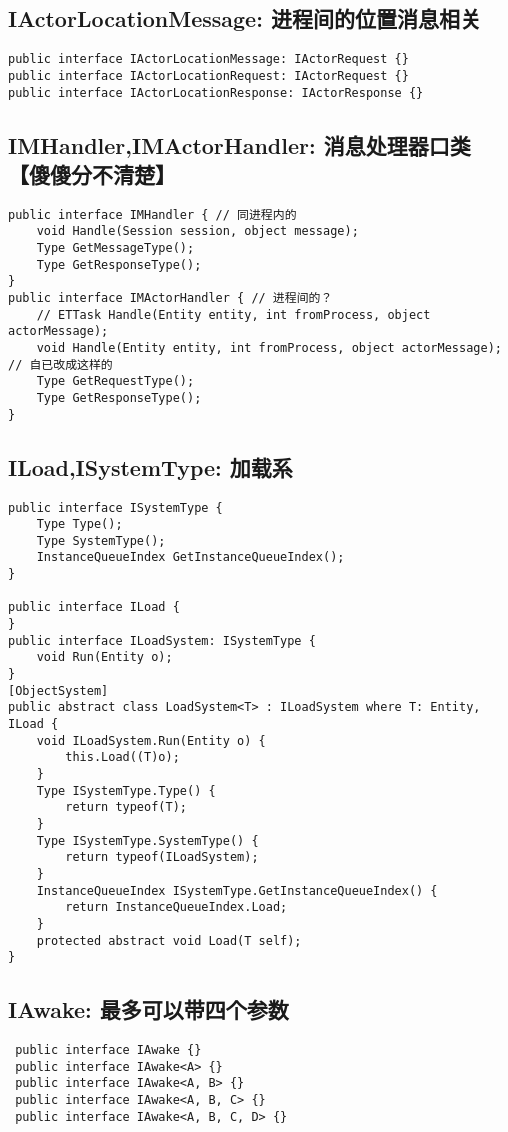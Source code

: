 \documentclass[9pt, b5paper]{article}
\begin{document}
\subsection{IActorLocationMessage: 进程间的位置消息相关}
\label{sec-2-3}
\begin{verbatim}
public interface IActorLocationMessage: IActorRequest {}
public interface IActorLocationRequest: IActorRequest {}
public interface IActorLocationResponse: IActorResponse {}
\end{verbatim}
\subsection{IMHandler,IMActorHandler: 消息处理器口类【傻傻分不清楚】}
\label{sec-2-4}
\begin{verbatim}
public interface IMHandler { // 同进程内的
    void Handle(Session session, object message);
    Type GetMessageType();
    Type GetResponseType();
}
public interface IMActorHandler { // 进程间的？
    // ETTask Handle(Entity entity, int fromProcess, object actorMessage);
    void Handle(Entity entity, int fromProcess, object actorMessage); // 自已改成这样的
    Type GetRequestType();
    Type GetResponseType();
}
\end{verbatim}
\subsection{ILoad,ISystemType: 加载系}
\label{sec-2-5}
\begin{verbatim}
public interface ISystemType {
    Type Type();
    Type SystemType();
    InstanceQueueIndex GetInstanceQueueIndex();
}

public interface ILoad {
}
public interface ILoadSystem: ISystemType {
    void Run(Entity o);
}
[ObjectSystem]
public abstract class LoadSystem<T> : ILoadSystem where T: Entity, ILoad {
    void ILoadSystem.Run(Entity o) {
        this.Load((T)o);
    }
    Type ISystemType.Type() {
        return typeof(T);
    }
    Type ISystemType.SystemType() {
        return typeof(ILoadSystem);
    }
    InstanceQueueIndex ISystemType.GetInstanceQueueIndex() {
        return InstanceQueueIndex.Load;
    }
    protected abstract void Load(T self);
}
\end{verbatim}
\subsection{IAwake: 最多可以带四个参数}
\label{sec-2-6}
\begin{verbatim}
 public interface IAwake {}
 public interface IAwake<A> {}
 public interface IAwake<A, B> {}
 public interface IAwake<A, B, C> {}
 public interface IAwake<A, B, C, D> {}
\end{verbatim}
\end{document}

